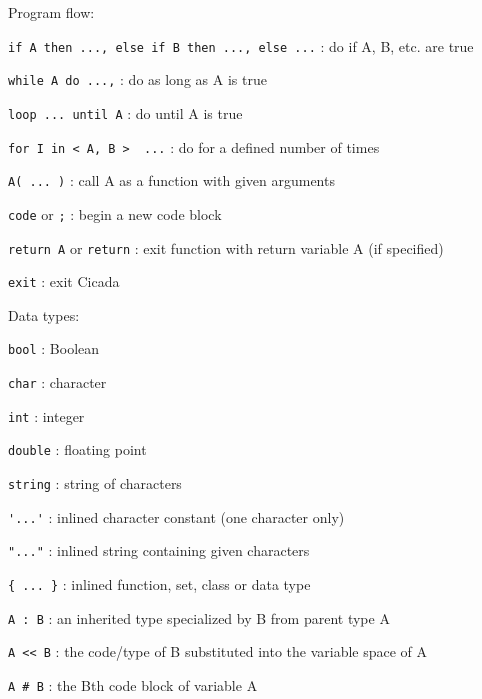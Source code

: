 \documentclass{article}
\begin{document}
\noindent
Program flow:
\begin{description}
\item{\verb#if A then ..., else if B then ..., else ...#} :  do if A, B, etc. are true
\item{\verb#while A do ...,#} :  do as long as A is true
\item{\verb#loop ... until A#} :  do until A is true
\item{\verb#for I in < A, B >  ...#} :  do for a defined number of times
\item{\verb#A( ... )#} :  call A as a function with given arguments
\item{\verb#code#} or \verb#;# :  begin a new code block
\item{\verb#return A#  or  \verb#return#} :  exit function with return variable A (if specified)
\item{\verb#exit#} :  exit Cicada\\
\end{description}

\noindent
Data types:
\begin{description}
\item{\verb#bool#} :  Boolean
\item{\verb#char#} :  character
\item{\verb#int#} :  integer
\item{\verb#double#} :  floating point
\item{\verb#string#} :  string of characters
\item{\verb#'...'#} :  inlined character constant (one character only)
\item{\verb#"..."#} :  inlined string containing given characters
\item{\verb#{ ... }#} :  inlined function, set, class or data type
\item{\verb#A : B#} :  an inherited type specialized by B from parent type A
\item{\verb#A << B#} :  the code/type of B substituted into the variable space of A
\item{\verb$A # B$} :  the Bth code block of variable A\\
\end{description}

 

\normalsize
\end{document}
